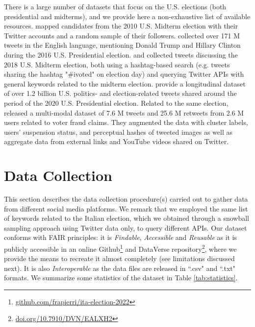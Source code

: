 \documentclass[letterpaper]{article} %
\begin{document}
There is a large number of datasets that focus on the U.S. elections (both presidential and midterms), and we provide here a non-exhaustive list of available resources. \cite{hanna2011mapping} mapped candidates from the 2010 U.S. Midterm election with their Twitter accounts and a random sample of their followers. \cite{bovet2019influence}  collected over 171 M tweets in the English language, mentioning Donald Trump and Hillary Clinton during the 2016 U.S. Presidential election. \cite{deb2019perils} and \cite{yang2022twitter} collected tweets discussing the 2018 U.S. Midterm election, both using a hashtag-based search (e.g. tweets sharing the hashtag "\#ivoted" on election day) and querying Twitter APIs with general keywords related to the midterm election. \cite{chen2022election2020} provide a longitudinal dataset of over 1.2 billion U.S. politics- and election-related tweets shared around the period of the 2020 U.S. Presidential election. Related to the same election, \cite{abilov2021voterfraud2020} released a multi-modal dataset of 7.6 M tweets and 25.6 M retweets from 2.6 M users related to voter fraud claims. They augmented the data with cluster labels, users' suspension status, and perceptual hashes of tweeted images as well as aggregate data from external links and YouTube videos shared on Twitter.

\section{Data Collection}

This section describes the data collection procedure(s) carried out to gather data from different social media platforms. We remark that we employed the same list of keywords related to the Italian election, which we obtained through a snowball sampling approach using Twitter data only, to query different APIs. Our dataset conforms with FAIR principles: it is \textit{Findable}, \textit{Accessible} and \textit{Reusable} as it is publicly accessible in an online Github\footnote{\url{github.com/frapierri/ita-election-2022}} and DataVerse repository\footnote{\url{doi.org/10.7910/DVN/EALXH2}}, where we provide the means to recreate it almost completely (see limitations discussed next). It is also \textit{Interoperable} as the data files are released in ``.csv" and ``.txt" formats.  We summarize some statistics of the dataset in Table \ref{tab:statistics}.
\end{document}
